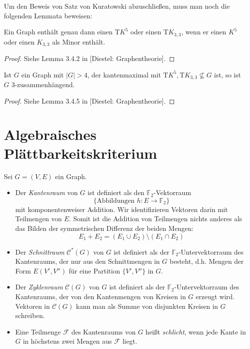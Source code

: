 \documentclass[10pt,b5paper]{article}
\begin{document}
Um den Beweis von Satz von Kuratowski abzuschließen, muss man noch die folgenden Lemmata beweisen:

\begin{lemma}
Ein Graph enthält genau dann einen $\mathrm{T}K^5$ oder einen $\mathrm{T}K_{3,3}$, wenn er einen $K^5$ oder einen $K_{3,3}$ als Minor enthält.
\end{lemma}

\begin{proof}
Siehe Lemma 3.4.2 in [Diestel: Graphentheorie].
\end{proof}

\begin{lemma}
Ist $G$ ein Graph mit $|G|>4$, der kantenmaximal mit $\mathrm{T}K^5,\mathrm{T}K_{3,3}\not\subseteq G$ ist, so ist $G$ $3$-zusammenhängend.
\end{lemma}

\begin{proof}
Siehe Lemma 3.4.5 in [Diestel: Graphentheorie].
\end{proof}

\section{Algebraisches Plättbarkeitskriterium}

\begin{definition}
Sei $G=(V, E)$ ein Graph.
\begin{itemize}
\item Der \textit{Kantenraum} von $G$ ist definiert als den $\mathbb{F}_2$-Vektorraum 
\[\{\text{Abbildungen } h:E\to\mathbb{F}_2\}\] 
mit komponentenweiser Addition. Wir identifizieren Vektoren darin mit Teilmengen von $E$. Somit ist die Addition von Teilmengen nichts anderes als das Bilden der symmetrischen Differenz der beiden Mengen:
\[ E_1 + E_2 = (E_1 \cup E_2) \setminus (E_1\cap E_2) \]
\item Der \textit{Schnittraum} $\mathcal{C}^\ast(G)$ von $G$ ist definiert als der $\mathbb{F}_2$-Untervektorraum des Kantenraums, der nur aus den Schnittmengen in $G$ besteht, d.h. Mengen der Form $E(V', V'')$ für eine Partition $\{V', V''\}$ in $G$.
\item  Der \textit{Zyklenraum} $\mathcal{C}(G)$ von $G$ ist definiert als der $\mathbb{F}_2$-Untervektorraum des Kantenraums, der von den Kantenmengen von Kreisen in $G$ erzeugt wird. Vektoren in $\mathcal{C}(G)$ kann man als Summe von disjunkten Kreisen in $G$ schreiben.
\item Eine Teilmenge $\mathcal{F}$ des Kantenraums von $G$ heißt \textit{schlicht}, wenn jede Kante in $G$ in höchstens zwei Mengen aus $\mathcal{F}$ liegt.
\end{itemize}
\end{definition}
\end{document}

